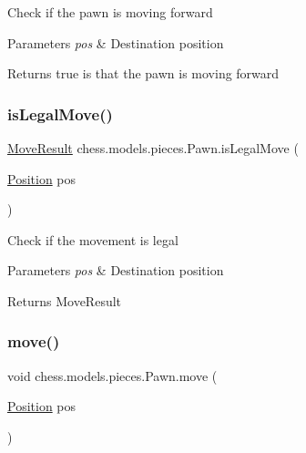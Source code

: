 Check if the pawn is moving forward


\begin{DoxyParams}{Parameters}
{\em pos} & Destination position \\
\hline
\end{DoxyParams}
\begin{DoxyReturn}{Returns}
true is that the pawn is moving forward 
\end{DoxyReturn}
\mbox{\label{classchess_1_1models_1_1pieces_1_1_pawn_ae293ed0d437de535ad14a543a1077871}} 
\subsubsection{\texorpdfstring{is\+Legal\+Move()}{isLegalMove()}}
{\footnotesize\ttfamily \mbox{\hyperlink{enumchess_1_1models_1_1enums_1_1_move_result}{Move\+Result}} chess.\+models.\+pieces.\+Pawn.\+is\+Legal\+Move (\begin{DoxyParamCaption}\item[{\mbox{\hyperlink{classchess_1_1models_1_1_position}{Position}}}]{pos }\end{DoxyParamCaption})}

Check if the movement is legal


\begin{DoxyParams}{Parameters}
{\em pos} & Destination position \\
\hline
\end{DoxyParams}
\begin{DoxyReturn}{Returns}
Move\+Result 
\end{DoxyReturn}
\mbox{\label{classchess_1_1models_1_1pieces_1_1_pawn_afb8291b2ab13822506cccad5dbe8fc91}} 
\subsubsection{\texorpdfstring{move()}{move()}}
{\footnotesize\ttfamily void chess.\+models.\+pieces.\+Pawn.\+move (\begin{DoxyParamCaption}\item[{\mbox{\hyperlink{classchess_1_1models_1_1_position}{Position}}}]{pos }\end{DoxyParamCaption})}

